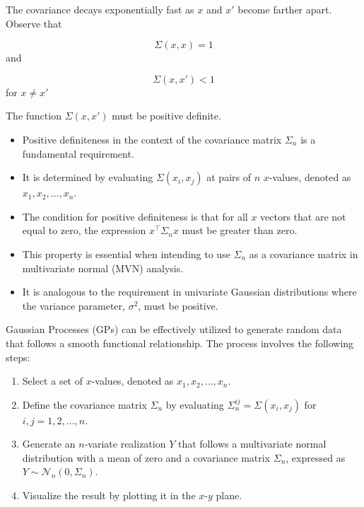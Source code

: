 \documentclass[
  letterpaper,
  DIV=11,
  numbers=noendperiod]{scrreprt}
\providecommand{\tightlist}{%
  \setlength{\itemsep}{0pt}\setlength{\parskip}{0pt}}\usepackage{longtable,booktabs,array}
\begin{document}
The covariance decays exponentially fast as \(x\) and \(x'\) become
farther apart. Observe that

\[\Sigma(x,x) = 1\] and

\[\Sigma(x, x') < 1\] for \(x \neq x'\)

The function \(\Sigma(x,x')\) must be positive definite.

\begin{tcolorbox}[enhanced jigsaw, rightrule=.15mm, opacityback=0, colframe=quarto-callout-note-color-frame, opacitybacktitle=0.6, toptitle=1mm, arc=.35mm, colbacktitle=quarto-callout-note-color!10!white, coltitle=black, toprule=.15mm, leftrule=.75mm, titlerule=0mm, title=\textcolor{quarto-callout-note-color}{\faInfo}\hspace{0.5em}{Positive Definiteness}, bottomrule=.15mm, breakable, bottomtitle=1mm, left=2mm, colback=white]

\begin{itemize}
\tightlist
\item
  Positive definiteness in the context of the covariance matrix
  \(\Sigma_n\) is a fundamental requirement.
\item
  It is determined by evaluating \(\Sigma(x_i, x_j)\) at pairs of \(n\)
  \(x\)-values, denoted as \(x_1, x_2, \ldots, x_n\).
\item
  The condition for positive definiteness is that for all \(x\) vectors
  that are not equal to zero, the expression \(x^\top \Sigma_n x\) must
  be greater than zero.
\item
  This property is essential when intending to use \(\Sigma_n\) as a
  covariance matrix in multivariate normal (MVN) analysis.
\item
  It is analogous to the requirement in univariate Gaussian
  distributions where the variance parameter, \(\sigma^2\), must be
  positive.
\end{itemize}

\end{tcolorbox}

Gaussian Processes (GPs) can be effectively utilized to generate random
data that follows a smooth functional relationship. The process involves
the following steps:

\begin{enumerate}
\def\labelenumi{\arabic{enumi}.}
\tightlist
\item
  Select a set of \(x\)-values, denoted as \(x_1, x_2, \ldots, x_n\).
\item
  Define the covariance matrix \(\Sigma_n\) by evaluating
  \(\Sigma_n^{ij} = \Sigma(x_i, x_j)\) for \(i, j = 1, 2, \ldots, n\).
\item
  Generate an \(n\)-variate realization \(Y\) that follows a
  multivariate normal distribution with a mean of zero and a covariance
  matrix \(\Sigma_n\), expressed as
  \(Y \sim \mathcal{N}_n(0, \Sigma_n)\).
\item
  Visualize the result by plotting it in the \(x\)-\(y\) plane.
\end{enumerate}
\end{document}
